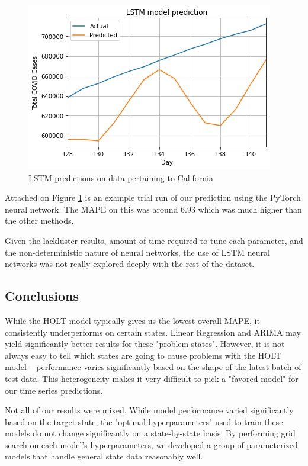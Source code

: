 \documentclass[sigconf,nonacm]{acmart}
\begin{document}
\begin{figure}
  \centering
  \includegraphics[width=\linewidth]{figures/LSTMPytorch.png}
  \caption{LSTM predictions on data pertaining to California}
  \label{fig:LSTMtrial}
\end{figure}

Attached on Figure  \ref{fig:LSTMtrial} is an example trial run of our
prediction using the PyTorch neural network. The MAPE on this was around $6.93$
which was much higher than the other methods.

Given the lackluster results, amount of time required to tune each parameter,
and the non-deterministic nature of neural networks, the use of LSTM neural
networks was not really explored deeply with the rest of the dataset.

\subsection{Conclusions}

While the HOLT model typically gives us the lowest overall MAPE, it
consistently underperforms on certain states. Linear Regression and ARIMA may
yield significantly better results for these "problem states". However, it is
not always easy to tell which states are going to cause problems with the HOLT
model -- performance varies significantly based on the shape of the latest
batch of test data. This heterogeneity makes it very difficult to pick a
"favored model" for our time series predictions. 

Not all of our results were mixed. While model performance varied significantly
based on the target state, the "optimal hyperparameters" used to train these
models do not change significantly on a state-by-state basis. By performing
grid search on each model's hyperparameters, we developed a group of
parameterized models that handle general state data reasonably well. 
\end{document}

